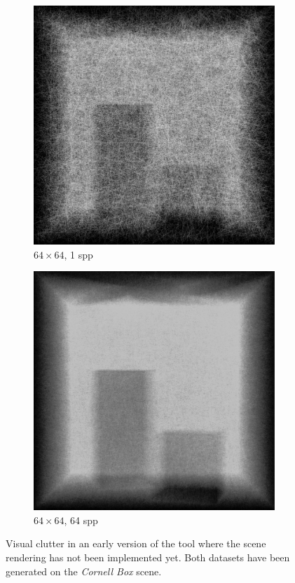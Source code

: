 \begin{figure}
	\centering
	\centering
	\begin{subfigure}[t]{0.49\linewidth}
		\includegraphics[width=\textwidth]{chapters/chapter_intro/clutter_early1}
		\caption{$64 \times 64$, 1 spp}
	\end{subfigure}
	\begin{subfigure}[t]{0.49\linewidth}
		\includegraphics[width=\textwidth]{chapters/chapter_intro/clutter_early2}
		\caption{$64 \times 64$, 64 spp}
	\end{subfigure}
	
	\caption{Visual clutter in an early version of the tool where the scene rendering has not been implemented yet. Both datasets have been generated on the \textit{Cornell Box} scene.}
	\label{visual_clutter}
\end{figure}

